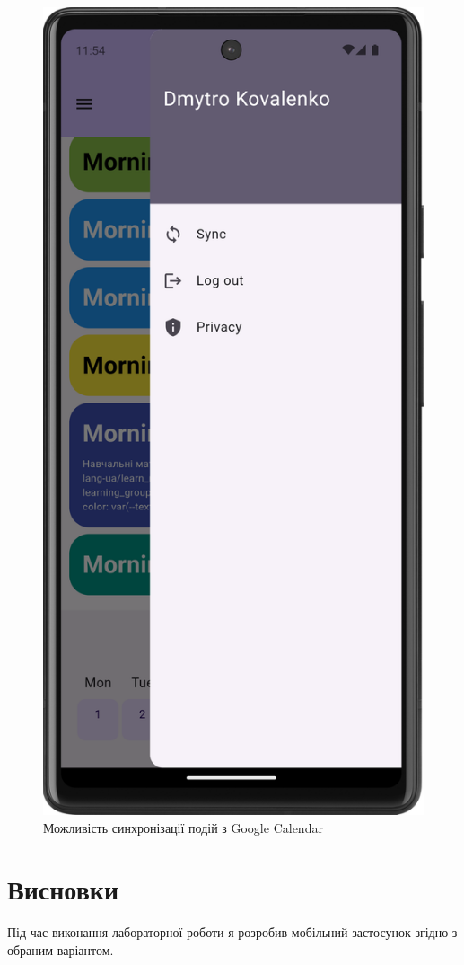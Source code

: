 \documentclass[oneside,14pt]{extarticle}
\begin{document}
\begin{normalsize}
\begin{figure}[H]
\begin{minipage}{0.48\textwidth}
		\end{minipage}\hfill
		\begin{minipage}{0.48\textwidth}
			\centering
			\includegraphics[scale=0.12]{8}
			\caption{Можливість синхронізації подій з Google Calendar}
		\end{minipage}
	\end{figure}
	
	\section*{Висновки}
	Під час виконання лабораторної роботи я розробив мобільний застосунок згідно з обраним варіантом.
	    
\end{normalsize}
\end{document}

